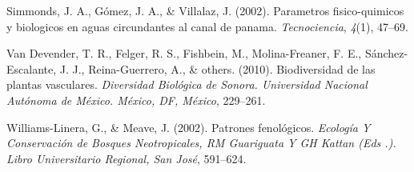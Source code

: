 \documentclass[11pt,]{article}
\begin{document}
\hypertarget{ref-simmonds2002parametros}{}
Simmonds, J. A., Gómez, J. A., \& Villalaz, J. (2002). Parametros
fisico-quimicos y biologicos en aguas circundantes al canal de panama.
\emph{Tecnociencia}, \emph{4}(1), 47--69.

\hypertarget{ref-van2010biodiversidad}{}
Van Devender, T. R., Felger, R. S., Fishbein, M., Molina-Freaner, F. E.,
Sánchez-Escalante, J. J., Reina-Guerrero, A., \& others. (2010).
Biodiversidad de las plantas vasculares. \emph{Diversidad Biológica de
Sonora. Universidad Nacional Autónoma de México. México, DF, México},
229--261.

\hypertarget{ref-williams2002patrones}{}
Williams-Linera, G., \& Meave, J. (2002). Patrones fenológicos.
\emph{Ecología Y Conservación de Bosques Neotropicales, RM Guariguata Y
GH Kattan (Eds .). Libro Universitario Regional, San José}, 591--624.




\newpage
\singlespacing 
\end{document}
